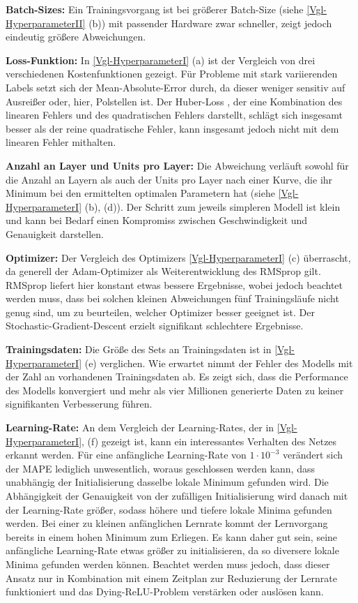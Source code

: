 \textbf{Batch-Sizes:}
Ein Trainingsvorgang ist bei größerer Batch-Size (siehe \textsf{\autoref{Vgl-HyperparameterII} (b)}) mit passender Hardware zwar schneller, zeigt jedoch eindeutig größere Abweichungen.

\textbf{Loss-Funktion:}
In \textsf{\autoref{Vgl-HyperparameterI} (a)}  ist der Vergleich von drei verschiedenen Kostenfunktionen gezeigt. Für Probleme mit stark variierenden Labels setzt sich der Mean-Absolute-Error durch, da dieser weniger sensitiv auf Ausreißer oder, hier, Polstellen ist. Der Huber-Loss \cite{huber}, der eine Kombination des linearen Fehlers und des quadratischen Fehlers darstellt, schlägt sich insgesamt besser als der reine quadratische Fehler, kann insgesamt jedoch nicht mit dem linearen Fehler mithalten. 

\textbf{Anzahl an Layer und Units pro Layer:}
Die Abweichung verläuft sowohl für die Anzahl an Layern als auch der Units pro Layer nach einer Kurve, die ihr Minimum bei den ermittelten optimalen Parametern hat (siehe \textsf{\autoref{Vgl-HyperparameterI} (b), (d)}). Der Schritt zum jeweils simpleren Modell ist klein und kann bei Bedarf einen Kompromiss zwischen Geschwindigkeit und Genauigkeit darstellen. 

\textbf{Optimizer:} Der Vergleich des Optimizers \textsf{\autoref{Vgl-HyperparameterI} (c)} überrascht, da generell der Adam-Optimizer \cite{Adam} als Weiterentwicklung des RMSprop \cite{RMSprop} gilt. RMSprop liefert hier konstant etwas bessere Ergebnisse, wobei jedoch beachtet werden muss, dass bei solchen kleinen Abweichungen fünf Trainingsläufe nicht genug sind, um zu beurteilen, welcher Optimizer besser geeignet ist. Der Stochastic-Gradient-Descent erzielt signifikant schlechtere Ergebnisse. 

\textbf{Trainingsdaten:}
Die Größe des Sets an Trainingsdaten ist in \textsf{\autoref{Vgl-HyperparameterI} (e)}  verglichen. Wie erwartet nimmt der Fehler des Modells mit der Zahl an vorhandenen Trainingsdaten ab. Es zeigt sich, dass die Performance des Modells konvergiert und mehr als vier Millionen generierte Daten zu keiner signifikanten Verbesserung führen. 

\textbf{Learning-Rate:}
An dem Vergleich der Learning-Rates, der in \textsf{\autoref{Vgl-HyperparameterI}, (f)} gezeigt ist, kann ein interessantes Verhalten des Netzes erkannt werden. Für eine anfängliche Learning-Rate von $1 \cdot 10^{-3}$ verändert sich der MAPE lediglich unwesentlich, woraus geschlossen werden kann, dass unabhängig der Initialisierung dasselbe lokale Minimum gefunden wird. Die Abhängigkeit der Genauigkeit von der zufälligen Initialisierung wird danach mit der Learning-Rate größer, sodass höhere und tiefere lokale Minima gefunden werden. Bei einer zu kleinen anfänglichen Lernrate kommt der Lernvorgang bereits in einem hohen Minimum zum Erliegen. Es kann daher gut sein, seine anfängliche Learning-Rate etwas größer zu initialisieren, da so diversere lokale Minima gefunden werden können. Beachtet werden muss jedoch, dass dieser Ansatz nur in Kombination mit einem Zeitplan zur Reduzierung der Lernrate funktioniert und das Dying-ReLU-Problem verstärken oder auslösen kann. 
 
